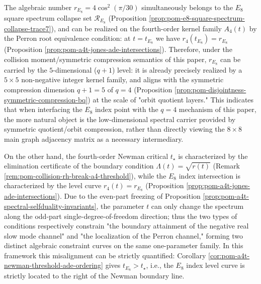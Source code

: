 \begin{remark}\label{rem:pom-e8-five-state-bridge}
The algebraic number \(r_{E_8}=4\cos^2(\pi/30)\) simultaneously belongs to the \(E_8\) square spectrum collapse set \(\mathcal R_{E_8}\) (Proposition \ref{prop:pom-e8-square-spectrum-collapse-trace7}), and can be realized on the fourth-order kernel family \(A_4(t)\) by the Perron root equivalence condition: at \(t=t_{E_8}\) we have \(r_4(t_{E_8})=r_{E_8}\) (Proposition \ref{prop:pom-a4t-jones-ade-intersections}).
Therefore, under the collision moment/symmetric compression semantics of this paper, \(r_{E_8}\) can be carried by the \(5\)-dimensional (\(q+1\)) level: it is already precisely realized by a \(5\times 5\) non-negative integer kernel family, and aligns with the symmetric compression dimension \(q+1=5\) of \(q=4\) (Proposition \ref{prop:pom-disjointness-symmetric-compression-bq}) at the scale of "orbit quotient layers."
This indicates that when interfacing the \(E_8\) index point with the \(q=4\) mechanism of this paper, the more natural object is the low-dimensional spectral carrier provided by symmetric quotient/orbit compression, rather than directly viewing the \(8\times 8\) main graph adjacency matrix as a necessary intermediary.
\par
On the other hand, the fourth-order Newman critical \(t_\star\) is characterized by the elimination certificate of the boundary condition \(\Lambda(t)=\sqrt{r(t)}\) (Remark \ref{rem:pom-collision-rh-break-a4-threshold}), while the \(E_8\) index intersection is characterized by the level curve \(r_4(t)=r_{E_8}\) (Proposition \ref{prop:pom-a4t-jones-ade-intersections}).
Due to the even-part freezing of Proposition \ref{prop:pom-a4t-spectral-selfduality-invariants}, the parameter \(t\) can only change the spectrum along the odd-part single-degree-of-freedom direction;
thus the two types of conditions respectively constrain "the boundary attainment of the negative real slow mode channel" and "the localization of the Perron channel," forming two distinct algebraic constraint curves on the same one-parameter family.
In this framework this misalignment can be strictly quantified: Corollary \ref{cor:pom-a4t-newman-threshold-ade-ordering} gives \(t_{E_8}>t_\star\), i.e., the \(E_8\) index level curve is strictly located to the right of the Newman boundary line.
\end{remark}



